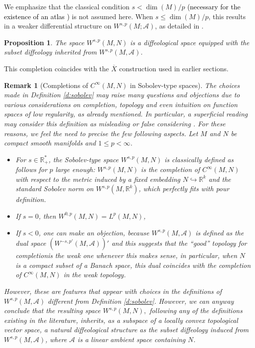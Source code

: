 \documentclass{amsart}
\newcounter{thm}
\newcounter{ex}
\newcounter{re}
\newtheorem{Proposition}[thm]{Proposition}
\newtheorem{remark}[thm]{Remark}
\begin{document}
We emphasize that the classical condition $s < \dim(M)/p$ \textcolor{black}{(necessary for the existence of an atlas \cite{Ee})} is not assumed here. When $s \leq \dim(M)/p$, this results in a weaker differential structure on $W^{s,p}(M;\mathcal{A})$, as detailed in \cite{Ma2019}.

\begin{Proposition}
	The space $W^{s,p}(M,N)$ is a diffeological space equipped with the subset diffeology inherited from $W^{s,p}(M,\mathcal{A})$.
\end{Proposition}

This completion coincides with the $\overline{X}$ construction used in earlier sections.

{\color{black}
\begin{remark}[Completions of \( C^\infty(M,N) \) in Sobolev-type spaces] The choices made in Definition \ref{d:sobolev} may raise many questions and objections due to various considerations on completion, topology and even intuition on function spaces of low regularity, as already mentioned. In particular, a superficial reading may consider this definition as misleading or false considering \cite{BZ1988,Bet1991}. For these reasons, we feel the need to precise the few following aspects.
Let \( M \) and \( N \) be compact smooth manifolds and \( 1 \le p < \infty \).
\begin{itemize}
  \item[(a)] For \( s \in \mathbb{R}_+^* \), the Sobolev-type space \( W^{s,p}(M,N) \) is classically defined as follows for $p$ large enough:
 \( W^{s,p}(M,N) \) is the completion of \( C^\infty(M,N) \)
  with respect to the metric induced by a fixed embedding \( N \hookrightarrow \mathbb{R}^k \)
  and the standard Sobolev norm on \( W^{s,p}(M,\mathbb{R}^k) \), which perfectly fits with pour definition.
  \item[(b)] If \( s = 0 \), then \( W^{0,p}(M,N) = L^p(M,N) \), 
  \item[(c)] If \( s < 0 \), one can make an objection, because \( W^{s,p}(M, \mathcal{A}) \) is defined as the dual space
  \( (W^{-s,p'}(M,\mathcal{A}))' \) and this suggests that the ``good'' topology for completionis the weak one  whenever this makes sense, in particular, when \(N\)
  is a compact subset of a Banach space, this dual coincides with the completion
  of \( C^\infty(M,N) \) in the weak topology.
\end{itemize}
However, these are features that appear with choices in the definitions of \( W^{s,p}(M, \mathcal{A}) \) different from Definition \ref{d:sobolev}. However, we can anyway conclude that 
the resulting space \( W^{s,p}(M,N), \) following any of the definitions existing in the literature, inherits, as a subspace of a locally convex topological vector space, a natural diffeological structure
as the subset diffeology induced from \( W^{s,p}(M,\mathcal{A}) \), where
\( \mathcal{A} \) is a linear ambient space containing \(N\).
\end{remark}}
\end{document}
